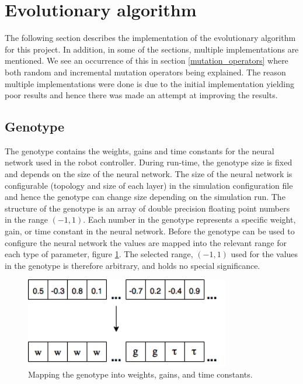 \section{Evolutionary algorithm}
The following section describes the implementation of the evolutionary algorithm for this project.
In addition, in some of the sections, multiple implementations are mentioned.
We see an occurrence of this in section \ref{mutation_operators} where both random and incremental mutation operators being explained.
The reason multiple implementations were done is due to the initial implementation yielding poor results and hence there was made an attempt at improving the results.
\subsection{Genotype}
\label{sec:genotype}
The genotype contains the weights, gains and time constants for the neural network used in the robot controller.
During run-time, the genotype size is fixed and depends on the size of the neural network.
The size of the neural network is configurable (topology and size of each layer) in the simulation configuration file and hence the genotype can change size depending on the simulation run.
The structure of the genotype is an array of double precision floating point numbers in the range $(-1, 1)$.
Each number in the genotype represents a specific weight, gain, or time constant in the neural network.
Before the genotype can be used to configure the neural network the values are mapped into the relevant range for each type of parameter, figure \ref{fig:genotype-mapping}.
The selected range, $(-1, 1)$ used for the values in the genotype is therefore arbitrary, and holds no special significance. 
		
\begin{figure}[H]		
	\centering
	\includegraphics[width=0.80\textwidth, clip]{chapters/res/genotype_translation.png}
	\caption{Mapping the genotype into weights, gains, and time constants.}
	\label{fig:genotype-mapping}
\end{figure}

